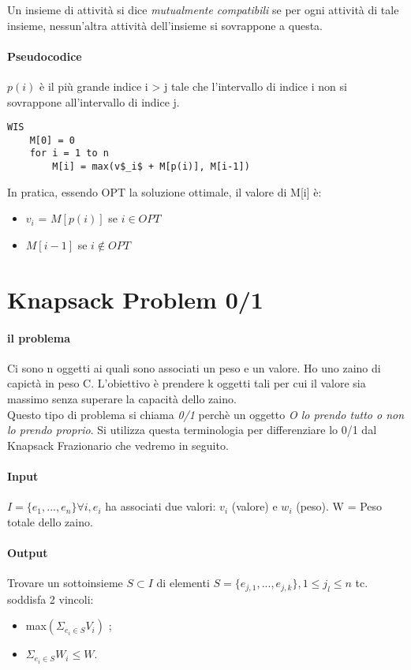 \documentclass[12pt, a4paper, openany]{book}
\begin{document}
Un insieme di attività si dice\emph{ mutualmente compatibili} se per ogni attività di tale insieme, nessun'altra attività dell'insieme si sovrappone a questa.


\paragraph{Pseudocodice}
$p(i)$ è il più grande indice i > j tale che l'intervallo di indice i non si sovrappone all'intervallo di indice j.
\begin{lstlisting}
WIS
	M[0] = 0
	for i = 1 to n
		M[i] = max(v$_i$ + M[p(i)], M[i-1])
\end{lstlisting}
In pratica, essendo OPT la soluzione ottimale, il valore di M[i] è:
\begin{itemize}
	\item $v_i$ = $M[p(i)]$ se $i \in OPT$
	\item $M[i-1]$ se $i \notin OPT$
\end{itemize}

\section{Knapsack Problem 0/1}
\paragraph{il problema} Ci sono n oggetti ai quali sono associati un peso e un valore. Ho uno zaino di capictà in peso C. L'obiettivo è prendere k oggetti tali per cui il valore sia massimo senza superare la capacità dello zaino.\\
Questo tipo di problema si chiama \emph{0/1} perchè un oggetto \emph{O lo prendo tutto o non lo prendo proprio}. Si utilizza questa terminologia per differenziare lo 0/1 dal Knapsack Frazionario che vedremo in seguito.
\paragraph{Input} $I = \{e_1,...,e_n\} \forall  i, e_i$ ha associati due valori: $v_i$ (valore) e $w_i$ (peso). W = Peso totale dello zaino.
\paragraph{Output} Trovare un sottoinsieme $ S \subset I $ di elementi $S = \{e_{j,1}, ..., e_{j,k}\} , 1 \leq j_l \leq n$ tc. soddisfa 2 vincoli:
\begin{itemize}
	\item max$(\Sigma_{e_i \in S}V_i)$ ;
	\item $\Sigma_{e_i \in S} W_i \leq W$.
\end{itemize}
\end{document}

